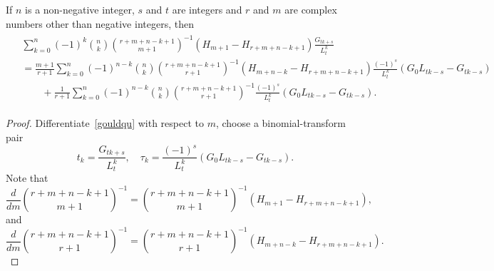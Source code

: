 \documentclass[12pt,reqno]{article}
\begin{document}
\begin{theorem}\label{gooday}
If $n$ is a non-negative integer, $s$ and $t$ are integers and $r$ and $m$ are complex numbers other than negative integers, then 
\begin{align}\label{gooday1}
\begin{split}
&\sum_{k=0}^n (-1)^k \binom{n}{k} \binom{r+m+n-k+1}{m+1}^{-1}\left(H_{m+1}-H_{r+m+n-k+1}\right)\frac{G_{tk+s}}{L_{t}^k} \\
&= \frac{m+1}{r+1}\sum_{k=0}^n (-1)^{n-k}\binom{n}{k}\binom{r+m+n-k+1}{r+1}^{-1}\left(H_{m+n-k}-H_{r+m+n-k+1}\right)\frac{(-1)^s}{L^k_t}\left(G_0L_{tk-s}-G_{tk-s}\right) \\
&\qquad +\frac1{r+1}\sum_{k=0}^n (-1)^{n-k} \binom{n}{k}\binom{r+m+n-k+1}{r+1}^{-1}\frac{(-1)^s}{L^k_t}\left(G_0L_{tk-s}-G_{tk-s}\right).
\end{split}
\end{align}
\end{theorem}
\begin{proof}
Differentiate~\eqref{gouldqu} with respect to $m$, choose a binomial-transform pair
$$t_k = \frac{G_{tk+s}}{L^k_t}, \quad \tau_k=\frac{(-1)^s}{L^k_t}\left(G_0L_{tk-s}-G_{tk-s}\right).$$
Note that
\begin{equation*}
\frac{d}{{dm}}\binom{{r + m + n - k + 1}}{{m + 1}}^{ - 1} = \binom{{r + m + n - k + 1}}{{m + 1}}^{ - 1} \left( {H_{m + 1} - H_{r + m + n - k + 1} } \right),
\end{equation*}
and
\begin{equation*}
\frac{d}{{dm}}\binom{{r + m + n - k + 1}}{{r + 1}}^{ - 1} = \binom{{r + m + n - k + 1}}{{r + 1}}^{ - 1} \left( {H_{m + n - k} - H_{r + m + n - k + 1} } \right).
\end{equation*}
\end{proof}
\end{document}
